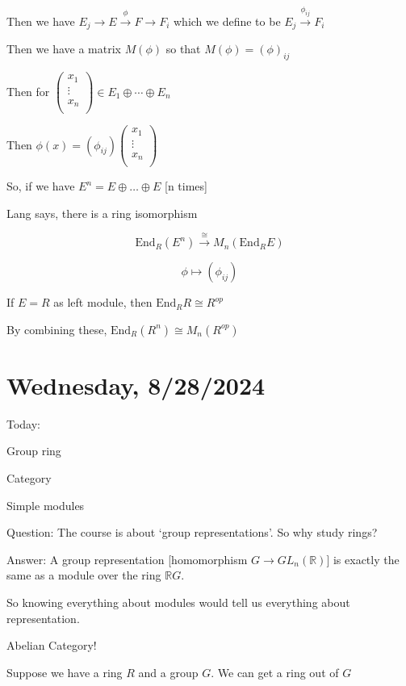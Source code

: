 \documentclass{article}
\theoremstyle{definition}
\begin{document}
Then we have \(E_j \to E \overset{\phi }{\to } F \to F_i\) which we define to be \(E_j \overset{\phi_{ij}}{\to } F_i\) 

Then we have a matrix \(M(\phi)\) so that \(M(\phi)=(\phi)_{ij}\) 

Then for \(\begin{pmatrix}
     x_1 \\
     \vdots \\
     x_n \\
\end{pmatrix}\in E_1 \oplus \cdots \oplus E_n\) 

Then \(\phi (x) = (\phi_{ij}) \begin{pmatrix}
     x_1 \\
     \vdots \\
     x_n \\
\end{pmatrix}\) 

So, if we have \(E^n = E \oplus \dots \oplus E\) [n times]

Lang says, there is a ring isomorphism

\[
    \text{End}_R(E^n) \overset{\cong}{\to } M_n(\text{End}_R E)
\]

\[
    \phi \mapsto (\phi_{ij})
\]

If \(E = R\) as left module, then \(\text{End}_R R \cong R^{op}\) 

By combining these, \(\text{End}_R(R^n)\cong M_n(R^{op})\) 


\section*{Wednesday, 8/28/2024}

Today:

Group ring

Category

Simple modules

Question: The course is about `group representations'. So why study rings?

Answer: A group representation [homomorphism \(G \to GL_n(\mathbb{R})\)] is exactly the same as a module over the ring \(\mathbb{R} G\).

So knowing everything about modules would tell us everything about representation.

Abelian Category!

Suppose we have a ring \(R\) and a group \(G\). We can get a ring out of \(G\)
\end{document}
